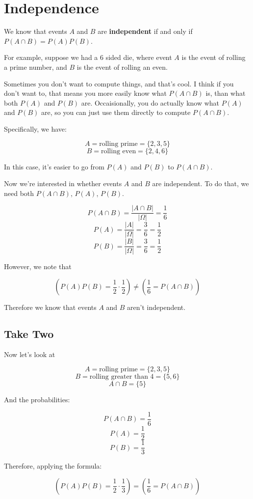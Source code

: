 \documentclass{article}
\begin{document}
\section*{Independence}

We know that events $A$ and $B$ are \textbf{independent} if and only
if $P(A\cap{}B)=P(A)P(B)$.

For example, suppose we had a 6 sided die, where event $A$ is the
event of rolling a prime number, and $B$ is the event of rolling an
even.

Sometimes you don't want to compute things, and that's cool. I think
if you don't want to, that means you more easily know what
$P(A\cap{}B)$ is, than what both $P(A)$ and $P(B)$ are. Occaisionally,
you do actually know what $P(A)$ and $P(B)$ are, so you can just use
them directly to compute $P(A\cap{}B)$.

Specifically, we have:

\[
A=\text{rolling prime} = \{2,3,5\}
\] \[
B =\text{rolling even} = \{2,4,6\}
\]

In this case, it's easier to go from $P(A)$ and $P(B)$ to
$P(A\cap{}B)$.

Now we're interested in whether events $A$ and $B$ are independent. To
do that, we need both $P(A\cap{}B)$, $P(A)$, $P(B)$.

\[
P(A\cap B)=\dfrac{|A\cap B|}{|\Omega|} = \dfrac{1}{6}
\] \[
P(A)=\dfrac{|A|}{|\Omega|}=\dfrac{3}{6}=\dfrac{1}{2}
\] \[
P(B)=\dfrac{|B|}{|\Omega|}=\dfrac{3}{6}=\dfrac{1}{2}
\]

However, we note that

\[
\left(P(A)P(B) = \dfrac{1}{2}\cdot\dfrac{1}{2}\right) \ne \left(\dfrac{1}{6}=P(A\cap B)\right)
\]

Therefore we know that events $A$ and $B$ aren't independent.

\subsection*{Take Two}

Now let's look at

\[
A=\text{rolling prime}=\{2,3,5\}
\] \[
B=\text{rolling greater than $4$}=\{5,6\}
\] \[
A\cap B=\{5\}
\]

And the probabilities:

\[
P(A\cap B)=\dfrac{1}{6}
\] \[
P(A) = \dfrac{1}{2}
\] \[
P(B) = \dfrac{1}{3}
\]

Therefore, applying the formula:

\[
\left(P(A)P(B) = \dfrac{1}{2}\cdot\dfrac{1}{3}\right) = \left(\dfrac{1}{6}=P(A\cap B)\right)
\]
\end{document}
